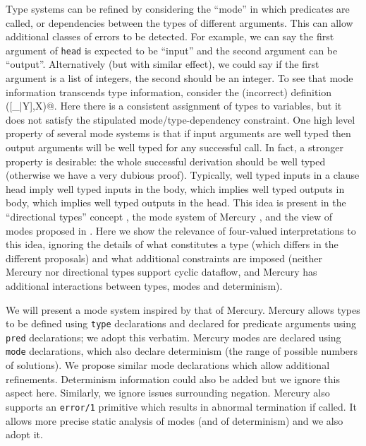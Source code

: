 \documentclass{tlp}
\begin{document}
Type systems can be refined by considering the ``mode'' in which
predicates are called, or dependencies between the types of different
arguments.  This can allow additional classes of errors to be detected.
For example, we can say the first argument of \texttt{head} is expected
to be ``input'' and the second argument can be ``output''.  Alternatively
(but with similar effect), we could say if the first argument is a list
of integers, the second should be an integer.  
To see that mode information transcends type information, consider the
(incorrect) definition \verb@head([_|Y],X)@.
Here there is a consistent assignment of types to variables, 
but it does not satisfy the stipulated mode/type-dependency constraint.
One high level property of several mode systems is that if input
arguments are well typed then output arguments will be well typed for
any successful call.  
In fact, a stronger property is desirable: the whole successful derivation
should be well typed (otherwise we have a very dubious proof).  Typically,
well typed inputs in a clause head imply well typed inputs in the body,
which implies well typed outputs in body, which implies well typed
outputs in the head.  This idea is present in the ``directional types''
concept \cite{Aiken-sas94,boye95}, the mode system of Mercury
\cite{mercury}, and the view of modes proposed in .
Here we show the relevance of four-valued interpretations to this idea,
ignoring the details of what constitutes a type (which differs in the
different proposals) and what additional constraints are imposed 
(neither Mercury nor directional types support cyclic dataflow, 
and Mercury has additional interactions between types, 
modes and determinism).


We will present a mode system inspired by that of Mercury.  Mercury
allows types to be defined using \texttt{type} declarations and
declared for predicate arguments using \texttt{pred} declarations; we
adopt this verbatim.  Mercury modes are declared using \texttt{mode}
declarations, which also declare determinism (the range of possible
numbers of solutions).  We propose similar mode declarations which allow
additional refinements.  Determinism information could also be added
but we ignore this aspect here.  Similarly, we ignore issues surrounding
negation.  Mercury also supports an
\texttt{error/1} primitive which results in abnormal termination if
called.  It allows more precise static analysis of modes 
(and of determinism) and we also adopt it.
\end{document}
